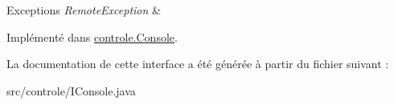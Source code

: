 \begin{DoxyExceptions}{Exceptions}
{\em Remote\-Exception} & \\
\hline
\end{DoxyExceptions}


Implémenté dans \hyperlink{classcontrole_1_1_console_a67a69e366628189229f757915169de2e}{controle.\-Console}.



La documentation de cette interface a été générée à partir du fichier suivant \-:\begin{DoxyCompactItemize}
\item 
src/controle/I\-Console.\-java\end{DoxyCompactItemize}
